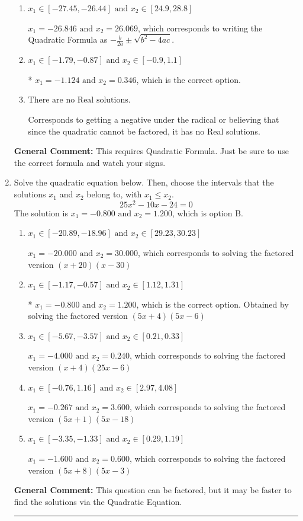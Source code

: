 \documentclass{extbook}[14pt]
\newcommand{\litem}[1]{\item #1

\rule{\textwidth}{0.4pt}}
\begin{document}
\begin{enumerate}
{\begin{enumerate}[label=\Alph*.]
 $x_1 = -6.229 \text{ and } x_2 = 20.229$, which corresponds to using the Quadratic Formula with $a=1$
\item \( x_1 \in [-27.45, -26.44] \text{ and } x_2 \in [24.9, 28.8] \)

 $x_1 = -26.846 \text{ and } x_2 = 26.069$, which corresponds to writing the Quadratic Formula as $-\frac{b}{2a} \pm \sqrt{b^2 - 4ac}$.
\item \( x_1 \in [-1.79, -0.87] \text{ and } x_2 \in [-0.9, 1.1] \)

* $x_1 = -1.124 \text{ and } x_2 = 0.346$, which is the correct option.
\item \( \text{There are no Real solutions.} \)

Corresponds to getting a negative under the radical or believing that since the quadratic cannot be factored, it has no Real solutions.
\end{enumerate}

\textbf{General Comment:} This requires Quadratic Formula. Just be sure to use the correct formula and watch your signs.
}
\litem{
Solve the quadratic equation below. Then, choose the intervals that the solutions $x_1$ and $x_2$ belong to, with $x_1 \leq x_2$.
\[ 25x^{2} -10 x -24 = 0 \]
The solution is \( x_1 = -0.800 \text{ and } x_2 = 1.200 \), which is option B.\begin{enumerate}[label=\Alph*.]
\item \( x_1 \in [-20.89, -18.96] \text{ and } x_2 \in [29.23, 30.23] \)

$x_1 = -20.000 \text{ and } x_2 = 30.000$, which corresponds to solving the factored version $(x + 20)(x -30)$
\item \( x_1 \in [-1.17, -0.57] \text{ and } x_2 \in [1.12, 1.31] \)

* $x_1 = -0.800 \text{ and } x_2 = 1.200$, which is the correct option. Obtained by solving the factored version $(5x + 4)(5x -6)$
\item \( x_1 \in [-5.67, -3.57] \text{ and } x_2 \in [0.21, 0.33] \)

$x_1 = -4.000 \text{ and } x_2 = 0.240$, which corresponds to solving the factored version $(x + 4)(25x -6)$
\item \( x_1 \in [-0.76, 1.16] \text{ and } x_2 \in [2.97, 4.08] \)

$x_1 = -0.267 \text{ and } x_2 = 3.600$, which corresponds to solving the factored version $(5x + 1)(5x -18)$
\item \( x_1 \in [-3.35, -1.33] \text{ and } x_2 \in [0.29, 1.19] \)

$x_1 = -1.600 \text{ and } x_2 = 0.600$, which corresponds to solving the factored version $(5x + 8)(5x -3)$
\end{enumerate}

\textbf{General Comment:} This question can be factored, but it may be faster to find the solutions via the Quadratic Equation.
}
\end{enumerate}
\end{document}
